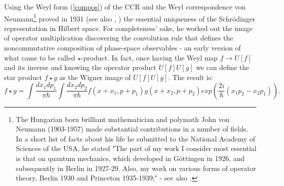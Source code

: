 \documentclass[12pt]{article}
\begin{document}
Using the Weyl form (\ref{compos}) of the CCR and the Weyl correspondence von Neumann\footnote{The Hungarian born brilliant mathematician 
and polymath John von Neumann (1903-1957) made substantial contributions in a number of fields. In a short list of facts about his life he 
submitted to the National Academy of Sciences of the USA, he stated "The part of my work I consider most essential is that on quantum 
mechanics, which developed in G\"ottingen in 1926, and subsequently in Berlin in 1927-29. Also, my work on various forms of operator theory, 
Berlin 1930 and Princeton 1935-1939;" - see also \cite{V58}.} proved in 1931 \cite{vN31} (see also \cite{vN}, \cite{V58}) the essential uniqueness 
of the Schr\"odinger representation in Hilbert space. For completeness' sake, he worked out the image of operator multiplication discovering 
the convolution rule that defines the noncommutative composition of phase-space observables - an early version of what came to be called 
$\star$-product. In fact, once having the Weyl map $f\rightarrow U[f]$ and its inverse and knowing the operator product $U[f]U[g]$ we can 
define the star product $f\star g$ as the Wigner image of $U[f] U[g]$. The result is:
\begin{equation}
\label{star}
f\star g = \int \frac{dx_1 dp_1}{\pi\hbar} \int \frac{dx_2 dp_2}{\pi \hbar} f(x+x_1, p+p_1) g(x+x_2, p+p_2) exp(\frac{2i}{\hbar}(x_1p_2 - x_2 p_1)).
\end{equation}
   
\end{document}
